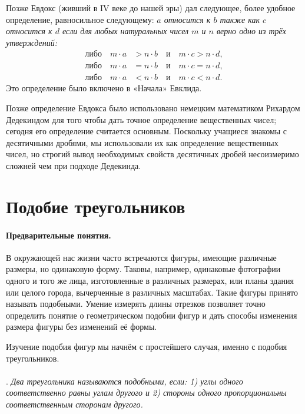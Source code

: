 \documentclass[twoside]{book}
\makeatletter
\newcommand{\rindex}[2][\imki@jobname]{%
  \index[#1]{\detokenize{#2}}%
}
\makeatother
\begin{document}
Позже Евдокс (живший в IV веке до нашей эры) дал следующее, более удобное определение, равносильное следующему: \emph{$a$ относится к $b$ также как $c$ относится к $d$ если для любых натуральных чисел $m$ и $n$ верно одно из трёх утверждений:
\begin{align*}
\text{либо}\quad m\cdot a&>n\cdot b\quad\text{и}\quad m\cdot c>n\cdot d,
\\
\text{либо}\quad m\cdot a&=n\cdot b\quad\text{и}\quad m\cdot c=n\cdot d,
\\
\text{либо}\quad m\cdot a&<n\cdot b\quad\text{и}\quad m\cdot c<n\cdot d.
\end{align*}
}
Это определение было включено в «Начала» Евклида.

Позже определение Евдокса было использовано немецким математиком Рихардом Дедекиндом для того чтобы дать точное определение вещественных чисел;
сегодня его определение считается основным.
Поскольку учащиеся знакомы с десятичными дробями, мы использовали их как определение вещественных чисел, но строгий вывод необходимых свойств десятичных дробей несоизмеримо сложней чем при подходе Дедекинда.




\section{Подобие треугольников}

\paragraph{Предварительные понятия.}\label{1938/156}
В окружающей нас жизни часто встречаются фигуры, имеющие различные размеры, но одинаковую форму.
Таковы, например, одинаковые фотографии одного и того же лица, изготовленные в различных размерах, или планы здания или целого города, вычерченные в различных масштабах. 
Такие фигуры принято называть подобными.
Умение измерять длины отрезков позволяет точно определить понятие о геометрическом подобии фигур и дать способы изменения размера фигуры без изменений её формы.

Изучение подобия фигур мы начнём с простейшего случая, именно с подобия треугольников.

\paragraph{}\label{1938/158}
.
\emph{Два треугольника называются \rindex{подобные!треугольники}подобными, если:
1) углы одного соответственно равны углам другого и 
2) стороны одного пропорциональны соответственным сторонам другого.}
\end{document}

